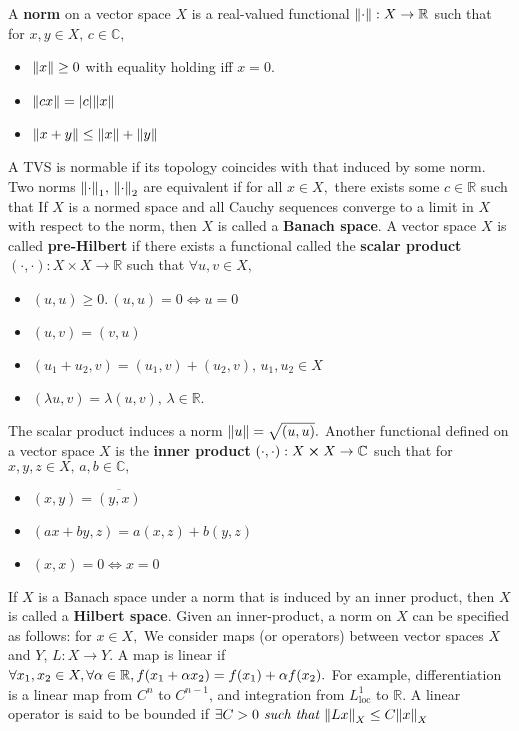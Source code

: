 A \textbf{norm} on a vector space $X$ is a real-valued functional $\norm{\cdot}:X\rightarrow\mathbb{R}$ such that for $x,y\in X,\,c\in\mathbb{C},$
\begin{itemize}
    \item $\norm{x}\geq0$ with equality holding iff $x=0.$
    \item $\norm{cx}=\abs{c}\norm{x}$
    \item $\norm{x+y}\leq\norm{x}+\norm{y}$
\end{itemize}
A TVS is normable if its topology coincides with that induced by some norm. Two norms $\norm{\cdot}_1 ,\,\norm{\cdot}_2$ are equivalent if for all $x\in X,$ there exists some $c\in\mathbb{R}$ such that
If $X$ is a normed space and all Cauchy sequences converge to a limit in $X$ with respect to the norm, then $X$ is called a \textbf{Banach space}. A vector space $X$ is called \textbf{pre-Hilbert} if there exists a functional called the \textbf{scalar product} $(\cdot,\cdot):X\times X\rightarrow\mathbb{R}$ such that $\forall u,v\in X,$
\begin{itemize}
    \item $(u,u)\geq 0.\,(u,u)=0\iff u=0$
    \item $(u,v)=(v,u)$
    \item $(u_1+u_2,v)=(u_1,v)+(u_2,v),\,u_1,u_2\in X$
    \item $(\lambda u,v)=\lambda(u,v),\,\lambda\in\mathbb{R}.$
\end{itemize}
The scalar product induces a norm $\norm{u}=\sqrt{(u,u)}.$ Another functional defined on a vector space $X$ is the \textbf{inner product} $(\cdot,\cdot):X\cross X\rightarrow \mathbb{C}$ such that for $x,y,z\in X,\, a,b\in\mathbb{C},$
\begin{itemize}
    \item $(x,y) = \overline{(y,x)}$
    \item $(ax+by,z) = a(x,z) + b(y,z)$
    \item $(x,x)=0\iff x=0$
\end{itemize}
If $X$ is a Banach space under a norm that is induced by an inner product, then $X$ is called a \textbf{Hilbert space}. Given an inner-product, a norm on $X$ can be specified as follows: for $x\in X,$
We consider maps (or operators) between vector spaces $X$ and $Y$, $L:X\rightarrow Y$. A map is linear if $\forall x_1,x_2\in X,\forall \alpha\in\mathbb{R},f(x_1+\alpha x_2)=f(x_1)+\alpha f(x_2).$ For example, differentiation is a linear map from $C^n$ to $C^{n-1}$, and integration from $L^1_\mathrm{loc}$ to $\mathbb{R}$. A linear operator is said to be bounded if $\exists C>0\textit{ such that } \norm{Lx}_X\leq C\norm{x}_X$

